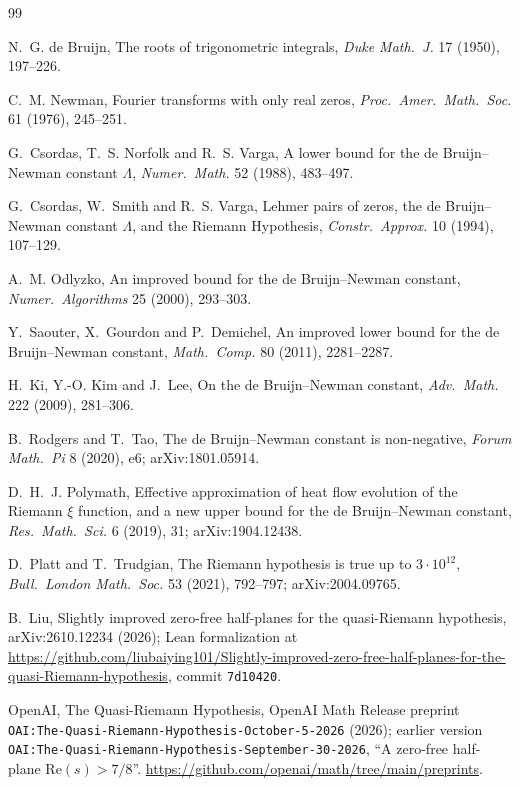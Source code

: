 \documentclass[11pt]{article}
\theoremstyle{definition}
\begin{document}
\begin{thebibliography}{99}\small

 N.~G. de Bruijn, The roots of trigonometric integrals, \emph{Duke Math.\ J.} 17 (1950), 197--226.

 C.~M. Newman, Fourier transforms with only real zeros, \emph{Proc.\ Amer.\ Math.\ Soc.} 61 (1976), 245--251.

 G.~Csordas, T.~S. Norfolk and R.~S. Varga, A lower bound for the de Bruijn--Newman constant $\Lambda$, \emph{Numer.\ Math.} 52 (1988), 483--497.

 G.~Csordas, W.~Smith and R.~S. Varga, Lehmer pairs of zeros, the de Bruijn--Newman constant $\Lambda$, and the Riemann Hypothesis, \emph{Constr.\ Approx.} 10 (1994), 107--129.

 A.~M. Odlyzko, An improved bound for the de Bruijn--Newman constant, \emph{Numer.\ Algorithms} 25 (2000), 293--303.

 Y.~Saouter, X.~Gourdon and P.~Demichel, An improved lower bound for the de Bruijn--Newman constant, \emph{Math.\ Comp.} 80 (2011), 2281--2287.

 H.~Ki, Y.-O. Kim and J.~Lee, On the de Bruijn--Newman constant, \emph{Adv.\ Math.} 222 (2009), 281--306.

 B.~Rodgers and T.~Tao, The de Bruijn--Newman constant is non-negative, \emph{Forum Math.\ Pi} 8 (2020), e6; arXiv:1801.05914.

 D.~H.~J. Polymath, Effective approximation of heat flow evolution of the Riemann $\xi$ function, and a new upper bound for the de Bruijn--Newman constant, \emph{Res.\ Math.\ Sci.} 6 (2019), 31; arXiv:1904.12438.

 D.~Platt and T.~Trudgian, The Riemann hypothesis is true up to $3 \cdot 10^{12}$, \emph{Bull.\ London Math.\ Soc.} 53 (2021), 792--797; arXiv:2004.09765.

 B.~Liu, Slightly improved zero-free half-planes for the quasi-Riemann hypothesis, arXiv:2610.12234 (2026); Lean formalization at \url{https://github.com/liubaiying101/Slightly-improved-zero-free-half-planes-for-the-quasi-Riemann-hypothesis}, commit \texttt{7d10420}.

 OpenAI, The Quasi-Riemann Hypothesis, OpenAI Math Release preprint \texttt{OAI:The-Quasi-Riemann-Hypothesis-October-5-2026} (2026); earlier version \texttt{OAI:The-Quasi-Riemann-Hypothesis-September-30-2026}, ``A zero-free half-plane $\mathrm{Re}(s) > 7/8$''. \url{https://github.com/openai/math/tree/main/preprints}.


\end{thebibliography}
\end{document}
